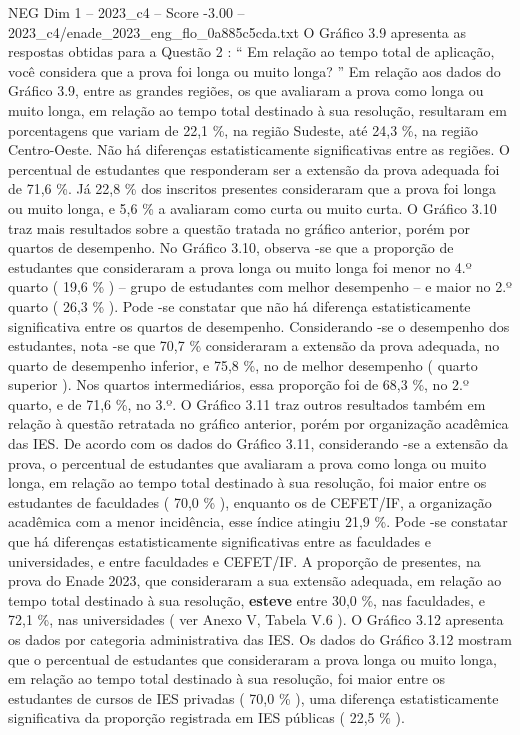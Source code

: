 \begin{textsample}{NEG Dim 1 – 2023\_c4 – Score -3.00 – 2023\_c4/enade\_2023\_eng\_flo\_0a885c5cda.txt}
O Gráfico 3.9 apresenta as respostas obtidas para a Questão 2 : “ Em relação ao tempo total de aplicação, você considera que a prova foi longa ou muito longa? ” Em relação aos dados do Gráfico 3.9, entre as grandes regiões, os que avaliaram a prova como longa ou muito longa, em relação ao tempo total destinado à sua resolução, resultaram em porcentagens que variam de 22,1 \%, na região Sudeste, até 24,3 \%, na região Centro-Oeste.
Não há diferenças estatisticamente significativas entre as regiões.
O percentual de estudantes que responderam ser a extensão da prova adequada foi de 71,6 \%.
Já 22,8 \% dos inscritos presentes consideraram que a prova foi longa ou muito longa, e 5,6 \% a avaliaram como curta ou muito curta.
O Gráfico 3.10 traz mais resultados sobre a questão tratada no gráfico anterior, porém por quartos de desempenho.
No Gráfico 3.10, observa -se que a proporção de estudantes que consideraram a prova longa ou muito longa foi menor no 4.º quarto ( 19,6 \% ) – grupo de estudantes com melhor desempenho – e maior no 2.º quarto ( 26,3 \% ).
Pode -se constatar que não há diferença estatisticamente significativa entre os quartos de desempenho.
Considerando -se o desempenho dos estudantes, nota -se que 70,7 \% consideraram a extensão da prova adequada, no quarto de desempenho inferior, e 75,8 \%, no de melhor desempenho ( quarto superior ).
Nos quartos intermediários, essa proporção foi de 68,3 \%, no 2.º quarto, e de 71,6 \%, no 3.º.
O Gráfico 3.11 traz outros resultados também em relação à questão retratada no gráfico anterior, porém por organização acadêmica das IES.
De acordo com os dados do Gráfico 3.11, considerando -se a extensão da prova, o percentual de estudantes que avaliaram a prova como longa ou muito longa, em relação ao tempo total destinado à sua resolução, foi maior entre os estudantes de faculdades ( 70,0 \% ), enquanto os de CEFET/IF, a organização acadêmica com a menor incidência, esse índice atingiu 21,9 \%.
Pode -se constatar que há diferenças estatisticamente significativas entre as faculdades e universidades, e entre faculdades e CEFET/IF.
A proporção de presentes, na prova do Enade 2023, que consideraram a sua extensão adequada, em relação ao tempo total destinado à sua resolução, \textbf{esteve} entre 30,0 \%, nas faculdades, e 72,1 \%, nas universidades ( ver Anexo V, Tabela V.6 ).
O Gráfico 3.12 apresenta os dados por categoria administrativa das IES.
Os dados do Gráfico 3.12 mostram que o percentual de estudantes que consideraram a prova longa ou muito longa, em relação ao tempo total destinado à sua resolução, foi maior entre os estudantes de cursos de IES privadas ( 70,0 \% ), uma diferença estatisticamente significativa da proporção registrada em IES públicas ( 22,5 \% ).

\end{textsample}
